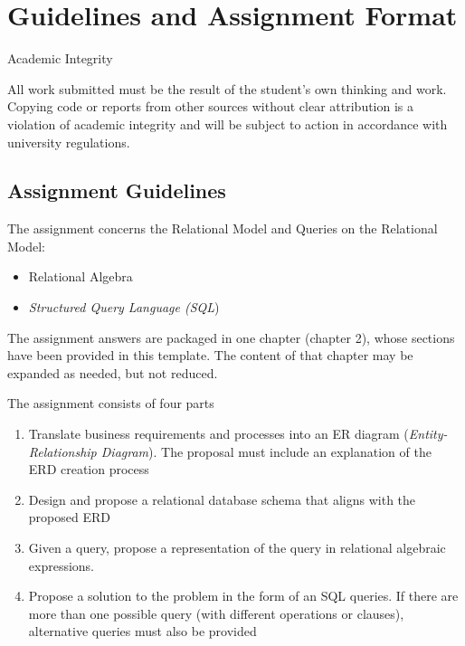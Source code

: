 \chapter{Guidelines and Assignment Format}
\begin{warnbox}{Academic Integrity}
\begin{center}
  All work submitted must be the result of the student's own thinking and work.
  Copying code or reports from other sources without clear attribution
  is a violation of academic integrity and will be subject to action in accordance
  with university regulations.
  \end{center}
\end{warnbox}
\section{Assignment Guidelines}
The assignment concerns the Relational Model and Queries on the Relational Model:
\begin{itemize}
    \itemsep0em
     \item Relational Algebra
     \item \textit{Structured Query Language (SQL})
\end{itemize}

The assignment answers are packaged in one chapter (chapter 2), whose sections have been provided in this template. The content of that chapter may be expanded as needed, but not reduced.

\begin{deliverablebox}{The assignment consists of four parts}
  \begin{enumerate}
    \itemsep0em
    \item Translate business requirements and processes into an ER diagram (\textit{Entity-Relationship Diagram}). The proposal must include an explanation of the ERD creation process
     \item Design and propose a relational database schema that aligns with the proposed ERD
     \item Given a query, propose a representation of the query in relational algebraic expressions.
     \item Propose a solution to the problem in the form of an SQL queries. If there are more than one possible query (with different operations or clauses), alternative queries must also be provided
\end{enumerate}
\end{deliverablebox}


